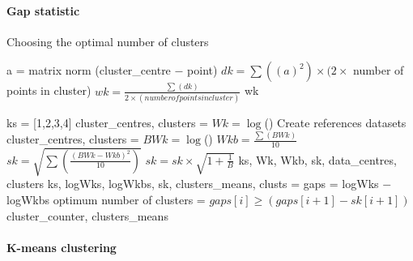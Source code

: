 \paragraph{Gap statistic}
\begin{algorithm}
\label{alg:GapStatistic}
\caption{Choosing the optimal number of clusters}
 \begin{algorithmic}[1]
    \Statex
    			\State a = matrix norm (cluster\_centre $-$ point)
    		\EndFor
    		\State $dk = \sum((a)^2 )\times (2 \times $ number of points in cluster)
    	\EndFor
    	\State $wk = \frac{ \sum(dk)}{2 \times (number of points in cluster)}$
    	\State \Return wk
    \EndFunction
    
    \Statex
    	 	\State ks = [1,2,3,4]
   			\State cluster\_centres, clusters = 
   			\State $Wk = \log$()   			
   			\State Create references datasets
			\State cluster\_centres, clusters =  
  			\State $BWk = \log$()
   			\EndFor   
   			\State $Wkb = \frac{\sum(BWk)}{10} $	
   			\State $sk = \sqrt{\sum(\frac{(BWk - Wkb)^2}{10})}$	
    	\EndFor
    \State $sk = sk \times \sqrt{1+\frac{1}{B}}$
    \State \Return ks, Wk, Wkb, sk, data\_centres, clusters
    \EndFunction
    \Statex
		    \State ks, logWks, logWkbs, sk, clusters\_means, clusts = 
		    \State gaps = logWks $-$ logWkbs
		    \State optimum number of clusters = $gaps[i] \geq (gaps[i+1]-sk[i+1])$
	\State \Return cluster\_counter, clusters\_means
	\EndFunction
  \end{algorithmic}
\end{algorithm}
\clearpage
\paragraph{K-means clustering}

